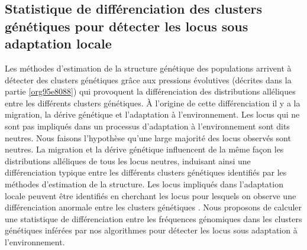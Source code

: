 \documentclass[12pt,a4paper,twoside]{ugathesis}
\begin{document}
\subsection{Statistique de différenciation des clusters génétiques pour détecter les locus sous adaptation locale}
\label{sec:orge8e6fb8}

Les méthodes d'estimation de la structure génétique des populations arrivent à
détecter des clusters génétiques grâce aux pressions évolutives (décrites dans
la partie \ref{org95e8088}) qui provoquent la différenciation des distributions
alléliques entre les différents clusters génétiques. À l'origine de cette
différenciation il y a la migration, la dérive génétique et l'adaptation à
l'environnement. Les locus qui ne sont pas impliqués dans un processus
d'adaptation à l'environnement sont dits neutres. Nous faisons l'hypothèse
qu'une large majorité des locus observés sont neutres. La migration et la dérive
génétique influencent de la même façon les distributions alléliques de tous les
locus neutres, induisant ainsi une différenciation typique entre les différents
clusters génétiques identifiés par les méthodes d'estimation de la structure.
Les locus impliqués dans l'adaptation locale peuvent être identifiés en
cherchant les locus pour lesquels on observe une différenciation anormale entre
les clusters génétiques \citep{Lewontin175}. Nous proposons de calculer une
statistique de différenciation entre les fréquences génomiques dans les clusters
génétiques inférées par nos algorithmes pour détecter les locus sous adaptation
à l'environnement.
\end{document}
